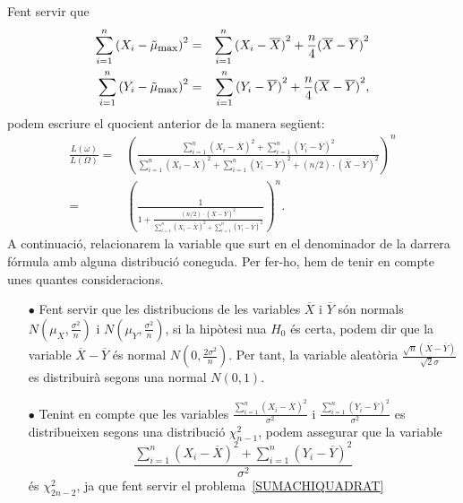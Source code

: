 {Fent servir que 
\begin{eqnarray*}
\sum_{i=1}^n {(X_i -\tilde{\mu}_{\mbox{\footnotesize max}})}^2 & = & \sum_{i=1}^n {(X_i -\overline{X})}^2
+\frac{n}{4} {(\overline{X}-\overline{Y})}^2 \\
\sum_{i=1}^n {(Y_i -\tilde{\mu}_{\mbox{\footnotesize max}})}^2 & = & \sum_{i=1}^n {(Y_i -\overline{Y})}^2
+\frac{n}{4} {(\overline{X}-\overline{Y})}^2,
\end{eqnarray*}
podem escriure el quocient anterior de la manera seg\"uent:
\begin{equation}
\begin{array}{rl}
\frac{L(\omega)}{L(\Omega)}= & 
{\left(\frac{
\sum\limits_{i=1}^n {(X_i -\overline{X})}^2 + 
\sum\limits_{i=1}^n {(Y_i -\overline{Y})}^2} 
{
\sum\limits_{i=1}^n {(X_i -\overline{X})}^2 + 
\sum\limits_{i=1}^n {(Y_i -\overline{Y})}^2 + (n/2)\cdot
{(\overline{X}-\overline{Y})}^2} 
\right)}^n  \\ = &
{\left(\frac{1}{1+\frac{(n/2)\cdot
{(\overline{X}-\overline{Y})}^2
}{
\sum\limits_{i=1}^n {(X_i -\overline{X})}^2 + 
\sum\limits_{i=1}^n {(Y_i -\overline{Y})}^2 
}}\right)}^n.
\end{array}
\label{QUOCIENTFUNVER}
\end{equation}
A continuaci\'o, relacionarem la variable que surt en el denominador
de la darrera f\'ormula amb alguna distribuci\'o coneguda.
Per fer-ho, hem de tenir en compte unes quantes consideracions.
\begin{itemize}
\item[$\bullet$]
Fent servir que les distribucions de les variables $\overline{X}$ i
$\overline{Y}$ s\'on normals $N\left(\mu_X,\frac{\sigma^2}{n}\right)$ i 
$N\left(\mu_Y,\frac{\sigma^2}{n}\right)$, si la hip\`otesi nu{\lgem}a $H_0$ \'es
certa, podem dir que la variable $\overline{X}-\overline{Y}$ \'es normal
$N\left(0,\frac{2\sigma^2}{n}\right)$. Per tant, la variable aleat\`oria \mbox{$\frac{\sqrt{n}
(\overline{X}-\overline{Y})}{\sqrt{2}\sigma}$} es distribuir\`a segons
una normal $N(0,1)$.
\item[$\bullet$]
Tenint en compte que les variables 
\mbox{$\frac{\sum\limits_{i=1}^n 
{(X_i -\overline{X})}^2}{\sigma^2}$} i 
\mbox{$\frac{\sum\limits_{i=1}^n 
{(Y_i -\overline{Y})}^2}{\sigma^2}$} es distribueixen segons una distribuci\'o
$\chi^2_{n-1}$, podem assegurar que 
la variable
\[
\frac{\sum\limits_{i=1}^n {(X_i -\overline{X})}^2 +
\sum\limits_{i=1}^n {(Y_i -\overline{Y})}^2}{\sigma^2}
\]
\'es $\chi^2_{2n-2}$,
ja que fent servir el problema~\ref{SUMACHIQUADRAT} 

\end{itemize}}
